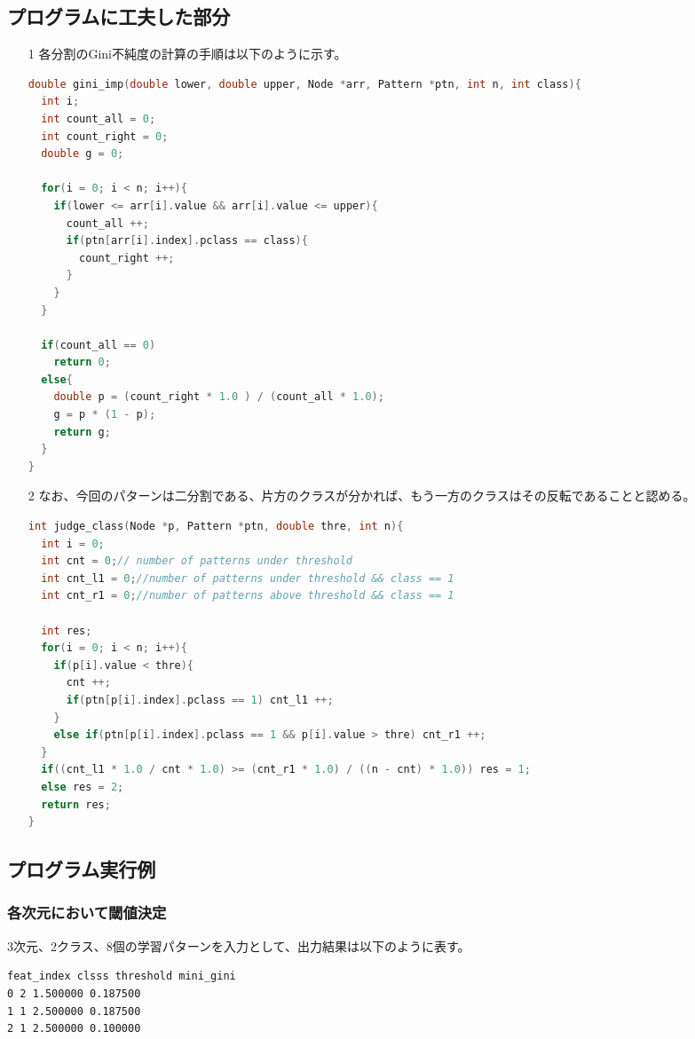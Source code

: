 \documentclass[ %
  uplatex,%
  papersize%
]{jsarticle}
\begin{document}
\subsection{プログラムに工夫した部分}
\begin{itemize}
\item[1] 各分割のGini不純度の計算の手順は以下のように示す。

\begin{lstlisting}[language=c,caption=Gini impurity]
  double gini_imp(double lower, double upper, Node *arr, Pattern *ptn, int n, int class){
  int i;
  int count_all = 0;
  int count_right = 0;
  double g = 0;

  for(i = 0; i < n; i++){
    if(lower <= arr[i].value && arr[i].value <= upper){
      count_all ++;
      if(ptn[arr[i].index].pclass == class){
        count_right ++;
      }
    }
  }
  
  if(count_all == 0)
    return 0;
  else{
    double p = (count_right * 1.0 ) / (count_all * 1.0);
    g = p * (1 - p);
    return g;
  }
}\end{lstlisting}

\item[2] なお、今回のパターンは二分割である、片方のクラスが分かれば、もう一方のクラスはその反転であることと認める。
\begin{lstlisting}[language=c,caption=Judge Class under Threshold]
int judge_class(Node *p, Pattern *ptn, double thre, int n){
  int i = 0;
  int cnt = 0;// number of patterns under threshold
  int cnt_l1 = 0;//number of patterns under threshold && class == 1
  int cnt_r1 = 0;//number of patterns above threshold && class == 1

  int res;
  for(i = 0; i < n; i++){
    if(p[i].value < thre){
      cnt ++;
      if(ptn[p[i].index].pclass == 1) cnt_l1 ++;
    }
    else if(ptn[p[i].index].pclass == 1 && p[i].value > thre) cnt_r1 ++;
  }
  if((cnt_l1 * 1.0 / cnt * 1.0) >= (cnt_r1 * 1.0) / ((n - cnt) * 1.0)) res = 1;
  else res = 2;
  return res;
}\end{lstlisting}
\end{itemize}

\subsection{プログラム実行例}
\subsubsection{各次元において閾値決定}
3次元、2クラス、8個の学習パターンを入力として、出力結果は以下のように表す。
\begin{lstlisting}[language=bash,caption=Recognition]
feat_index clsss threshold mini_gini
0 2 1.500000 0.187500
1 1 2.500000 0.187500
2 1 2.500000 0.100000
\end{lstlisting}
\end{document}
